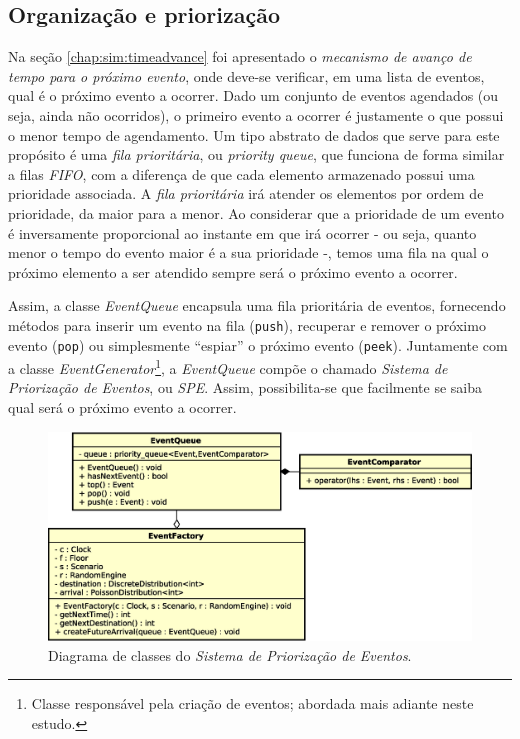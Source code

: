 \subsection{Organização e priorização}

Na seção \ref{chap:sim:timeadvance} foi apresentado o \textit{mecanismo de
avanço de tempo para o próximo evento}, onde deve-se verificar, em uma lista de
eventos, qual é o próximo evento a ocorrer. Dado um conjunto de eventos
agendados (ou seja, ainda não ocorridos), o primeiro evento a ocorrer é
justamente o que possui o menor tempo de agendamento. Um tipo abstrato de dados
que serve para este propósito é uma \textit{fila prioritária}, ou
\textit{priority queue}, que funciona de forma similar a filas \textit{FIFO},
com a diferença de que cada elemento armazenado possui uma prioridade associada.
A \textit{fila prioritária} irá atender os elementos por ordem de prioridade, da
maior para a menor. Ao considerar que a prioridade de um evento é inversamente
proporcional ao instante em que irá ocorrer - ou seja, quanto menor o tempo do
evento maior é a sua prioridade -, temos uma fila na qual o próximo elemento a
ser atendido sempre será o próximo evento a ocorrer.

Assim, a classe \textit{EventQueue} encapsula uma fila prioritária de eventos,
fornecendo métodos para inserir um evento na fila (\texttt{push}), recuperar e
remover o próximo evento (\texttt{pop}) ou simplesmente ``espiar'' o próximo
evento (\texttt{peek}). Juntamente com a classe
\textit{EventGenerator}\footnote{Classe responsável pela criação de eventos;
abordada mais adiante neste estudo.}, a \textit{EventQueue} compõe o chamado
\textit{Sistema de Priorização de Eventos}, ou \textit{SPE}. Assim,
possibilita-se que facilmente se saiba qual será o próximo evento a ocorrer.

\begin{figure}[htb!]
  \centering
  \includegraphics[scale=0.6]{img/EventQueue.eps}
  \caption{Diagrama de classes do \textit{Sistema de Priorização de Eventos}.}
\label{fig:diagram:event:manage}
\end{figure}

